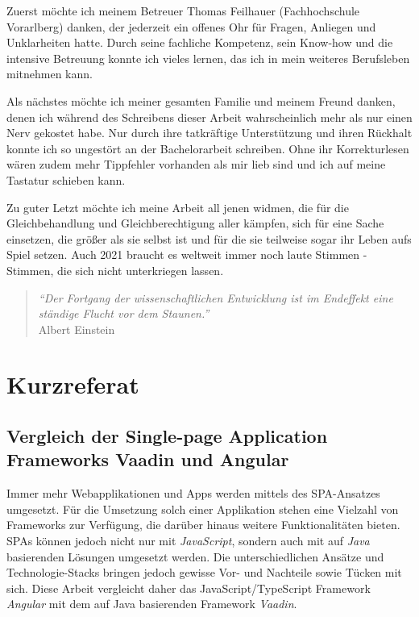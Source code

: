 \documentclass[a4paper,12pt,twoside]{scrreprt}
\begin{document}
\medskip

Zuerst möchte ich meinem Betreuer Thomas Feilhauer (Fachhochschule Vorarlberg) danken, der jederzeit ein offenes Ohr für Fragen, Anliegen und Unklarheiten hatte. Durch seine fachliche Kompetenz, sein Know-how und die intensive Betreuung konnte ich vieles lernen, das ich in mein weiteres Berufsleben mitnehmen kann.

\medskip

Als nächstes möchte ich meiner gesamten Familie und meinem Freund danken, denen ich während des Schreibens dieser Arbeit wahrscheinlich mehr als nur einen Nerv gekostet habe. Nur durch ihre tatkräftige Unterstützung und ihren Rückhalt konnte ich so ungestört an der Bachelorarbeit schreiben. Ohne ihr Korrekturlesen wären zudem mehr Tippfehler vorhanden als mir lieb sind und ich auf meine Tastatur schieben kann.

\medskip

Zu guter Letzt möchte ich meine Arbeit all jenen widmen, die für die Gleichbehandlung und Gleichberechtigung aller kämpfen, sich für eine Sache einsetzen, die größer als sie selbst ist und für die sie teilweise sogar ihr Leben aufs Spiel setzen. Auch 2021 braucht es weltweit immer noch laute Stimmen - Stimmen, die sich nicht unterkriegen lassen.

\bigskip

\begin{quote}
    \begin{flushright}
        \textit{\enquote{Der Fortgang der wissenschaftlichen Entwicklung ist im Endeffekt eine ständige Flucht vor dem Staunen.}}\\
        Albert Einstein
    \end{flushright}
\end{quote}

\newpage
\section*{Kurzreferat}
\label{sec:kurzreferat}

\subsection*{Vergleich der Single-page Application Frameworks Vaadin und Angular}

Immer mehr Webapplikationen und Apps werden mittels des \acs{SPA}-Ansatzes umgesetzt. Für die Umsetzung solch einer Applikation stehen eine Vielzahl von Frameworks zur Verfügung, die darüber hinaus weitere Funktionalitäten bieten. \acsp{SPA} können jedoch nicht nur mit \textit{JavaScript}, sondern auch mit auf \textit{Java} basierenden Lösungen umgesetzt werden. Die unterschiedlichen Ansätze und Technologie-Stacks bringen jedoch gewisse Vor- und Nachteile sowie Tücken mit sich. Diese Arbeit vergleicht daher das JavaScript/TypeScript Framework \textit{Angular} mit dem auf Java basierenden Framework \textit{Vaadin}.
\end{document}

